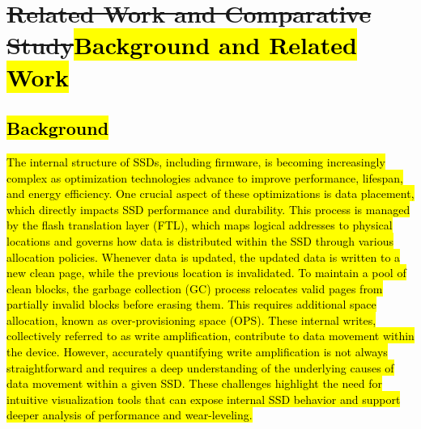 \documentclass{ieeeaccess}
\begin{document}
\section{\texorpdfstring{\sout{Related Work and Comparative Study}\hl{Background and Related Work}}{Background and Related Work}}
\label{subsec:related_work}

\subsection{\texorpdfstring{\hl{Background}}{Background}}
\hl{The internal structure of SSDs, including firmware, is becoming increasingly complex as optimization technologies advance to improve performance, lifespan, and energy efficiency. One crucial aspect of these optimizations is data placement, which directly impacts SSD performance and durability. This process is managed by the flash translation layer (FTL), which maps logical addresses to physical locations and governs how data is distributed within the SSD through various allocation policies. Whenever data is updated, the updated data is written to a new clean page, while the previous location is invalidated. To maintain a pool of clean blocks, the garbage collection (GC) process relocates valid pages from partially invalid blocks before erasing them. This requires additional space allocation, known as over-provisioning space (OPS). These internal writes, collectively referred to as write amplification, contribute to data movement within the device. However, accurately quantifying write amplification is not always straightforward and requires a deep understanding of the underlying causes of data movement within a given SSD. These challenges highlight the need for intuitive visualization tools that can expose internal SSD behavior and support deeper analysis of performance and wear-leveling.}
\end{document}
